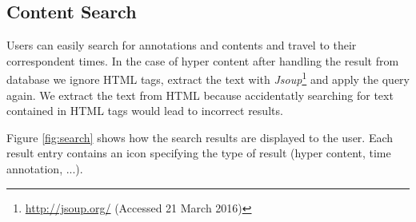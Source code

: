 	\subsection{Content Search}

	Users can easily search for annotations and contents and travel to their correspondent times. In the case of hyper content after handling the result from database we ignore \ac{HTML} tags, extract the text with \emph{Jsoup}\footnote{\url{http://jsoup.org/} (Accessed 21 March 2016)} and apply the query again. We extract the text from \ac{HTML} because accidentatly searching for text contained in \ac{HTML} tags would lead to incorrect results.

	Figure \ref{fig:search} shows how the search results are displayed to the user. Each result entry contains an icon specifying the type of result (hyper content, time annotation, ...).




